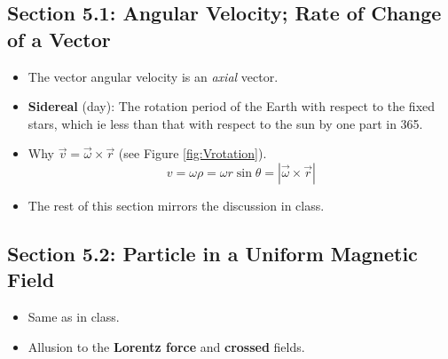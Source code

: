 \documentclass[../notes.tex]{subfiles}
\begin{document}
\subsection*{Section 5.1: Angular Velocity; Rate of Change of a Vector}
\begin{itemize}
    \item {}The vector angular velocity is an \emph{axial} vector.
    \item \textbf{Sidereal} (day): The rotation period of the Earth with respect to the fixed stars, which ie less than that with respect to the sun by one part in 365.
    \item Why $\vec{v}=\vec{\omega}\times\vec{r}$ (see Figure \ref{fig:Vrotation}).
    \begin{equation*}
        v = \omega\rho = \omega r\sin\theta = |\vec{\omega}\times\vec{r}|
    \end{equation*}
    \item The rest of this section mirrors the discussion in class.
\end{itemize}


\subsection*{Section 5.2: Particle in a Uniform Magnetic Field}
\begin{itemize}
    \item Same as in class.
    \item Allusion to the \textbf{Lorentz force} and \textbf{crossed} fields.
\end{itemize}
\end{document}
